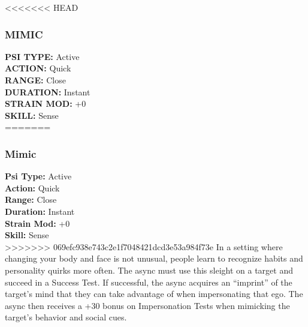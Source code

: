 <<<<<<< HEAD \subsubsection{MIMIC} \textbf{PSI TYPE:} Active \\ \textbf{ACTION:} Quick \\ \textbf{RANGE:} Close \\ \textbf{DURATION:} Instant \\ \textbf{STRAIN MOD:} +0 \\ \textbf{SKILL:} Sense\\ ======= \subsubsection{Mimic} \textbf{Psi Type:} Active \\ \textbf{Action:} Quick \\ \textbf{Range:} Close \\ \textbf{Duration:} Instant \\ \textbf{Strain Mod:} +0 \\ \textbf{Skill:} Sense\\ >>>>>>> 069efc938e743c2e1f7048421dcd3e53a984f73e In a setting where changing your body and face is not unusual, people learn to recognize habits and personality quirks more often. The async must use this sleight on a target and succeed in a Success Test. If successful, the async acquires an “imprint” of the target’s mind that they can take advantage of when impersonating that ego. The async then receives a +30 bonus on Impersonation Tests when mimicking the target’s behavior and social cues. 

